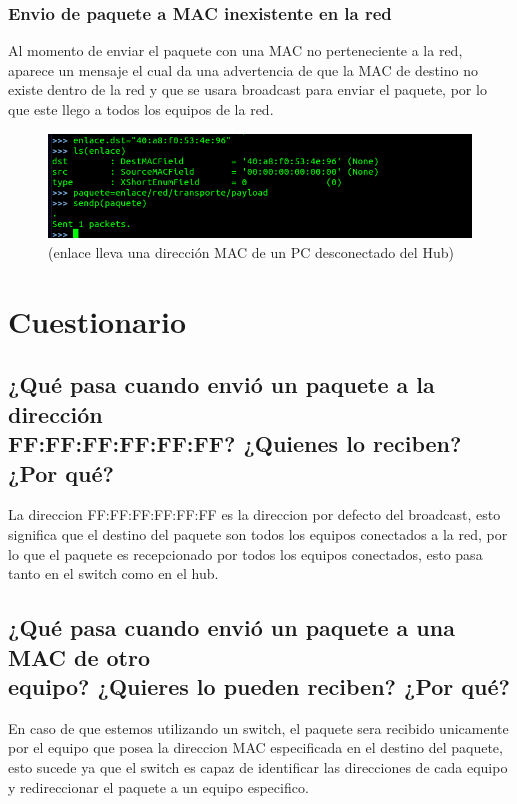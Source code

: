\documentclass[spanish]{udpreport}
\begin{document}
\subsection{Envio de paquete a MAC inexistente en la red}
Al momento de enviar el paquete con una MAC no perteneciente a la red, aparece un mensaje el cual da una advertencia de que la MAC de destino no existe dentro de la red y que se usara broadcast para enviar el paquete, por lo que este llego a todos los equipos de la red.
\begin{figure}[H]
\begin{center}
\includegraphics[scale=0.7]{images/Hub3.png}
(enlace lleva una dirección MAC de un PC desconectado del Hub)
\end{center}
\end{figure}




\vspace{12cm}
\chapter{Cuestionario}
\section{¿Qué pasa cuando envió un paquete a la dirección\\ FF:FF:FF:FF:FF:FF? ¿Quienes
lo reciben? ¿Por qué?}

La direccion FF:FF:FF:FF:FF:FF es la direccion por defecto del broadcast, esto significa que el destino del paquete son todos los equipos conectados a la red, por lo que el paquete es recepcionado por todos los equipos conectados, esto pasa tanto en el switch como en el hub.

\section{¿Qué pasa cuando envió un paquete a una MAC de otro\\ equipo? ¿Quieres lo pueden reciben? ¿Por qué?}

En caso de que estemos utilizando un switch, el paquete sera recibido  unicamente por el equipo que posea la direccion MAC especificada en el destino del paquete, esto sucede ya que el switch es capaz de identificar las direcciones de cada equipo y redireccionar el paquete a un equipo especifico.\\
\end{document}

